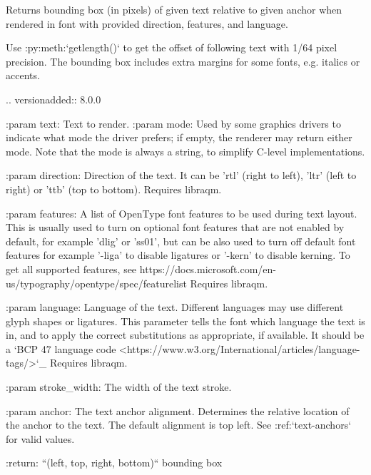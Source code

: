 \begin{DoxyVerb}Returns bounding box (in pixels) of given text relative to given anchor
when rendered in font with provided direction, features, and language.

Use :py:meth:`getlength()` to get the offset of following text with
1/64 pixel precision. The bounding box includes extra margins for
some fonts, e.g. italics or accents.

.. versionadded:: 8.0.0

:param text: Text to render.
:param mode: Used by some graphics drivers to indicate what mode the
     driver prefers; if empty, the renderer may return either
     mode. Note that the mode is always a string, to simplify
     C-level implementations.

:param direction: Direction of the text. It can be 'rtl' (right to
          left), 'ltr' (left to right) or 'ttb' (top to bottom).
          Requires libraqm.

:param features: A list of OpenType font features to be used during text
         layout. This is usually used to turn on optional
         font features that are not enabled by default,
         for example 'dlig' or 'ss01', but can be also
         used to turn off default font features for
         example '-liga' to disable ligatures or '-kern'
         to disable kerning.  To get all supported
         features, see
         https://docs.microsoft.com/en-us/typography/opentype/spec/featurelist
         Requires libraqm.

:param language: Language of the text. Different languages may use
         different glyph shapes or ligatures. This parameter tells
         the font which language the text is in, and to apply the
         correct substitutions as appropriate, if available.
         It should be a `BCP 47 language code
         <https://www.w3.org/International/articles/language-tags/>`_
         Requires libraqm.

:param stroke_width: The width of the text stroke.

:param anchor:  The text anchor alignment. Determines the relative location of
        the anchor to the text. The default alignment is top left.
        See :ref:`text-anchors` for valid values.

:return: ``(left, top, right, bottom)`` bounding box
\end{DoxyVerb}
 \mbox{\label{classPIL_1_1ImageFont_1_1FreeTypeFont_a712468926539e605d8fb234fea7c9db4}} 
